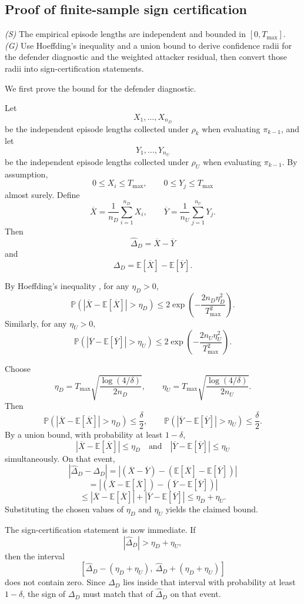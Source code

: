 \documentclass[11pt]{article}
\newcommand{\E}{\mathbb{E}}
\newcommand{\Prob}{\mathbb{P}}
\begin{document}
\subsection{Proof of finite-sample sign certification}

\noindent\textit{(S)} The empirical episode lengths are independent and bounded in $[0,T_{\max}]$. \textit{(G)} Use Hoeffding's inequality and a union bound to derive confidence radii for the defender diagnostic and the weighted attacker residual, then convert those radii into sign-certification statements.

We first prove the bound for the defender diagnostic.

Let
\[
X_1,\dots,X_{n_D}
\]
be the independent episode lengths collected under $\rho_k$ when evaluating $\pi_{k-1}$, and let
\[
Y_1,\dots,Y_{n_U}
\]
be the independent episode lengths collected under $\rho_U$ when evaluating $\pi_{k-1}$. By assumption,
\[
0 \le X_i \le T_{\max}, \qquad 0 \le Y_j \le T_{\max}
\]
almost surely. Define
\[
\overline{X}=\frac{1}{n_D}\sum_{i=1}^{n_D}X_i, \qquad \overline{Y}=\frac{1}{n_U}\sum_{j=1}^{n_U}Y_j.
\]
Then
\[
\widehat{\Delta}_D=\overline{X}-\overline{Y}
\]
and
\[
\Delta_D=\E[\overline{X}]-\E[\overline{Y}].
\]

By Hoeffding's inequality \citep{Hoeffding1963}, for any $\eta_D>0$,
\[
\Prob\left(|\overline{X}-\E[\overline{X}]|>\eta_D\right)
\le
2\exp\left(-\frac{2n_D\eta_D^2}{T_{\max}^2}\right).
\]
Similarly, for any $\eta_U>0$,
\[
\Prob\left(|\overline{Y}-\E[\overline{Y}]|>\eta_U\right)
\le
2\exp\left(-\frac{2n_U\eta_U^2}{T_{\max}^2}\right).
\]

Choose
\[
\eta_D=T_{\max}\sqrt{\frac{\log(4/\delta)}{2n_D}},
\qquad
\eta_U=T_{\max}\sqrt{\frac{\log(4/\delta)}{2n_U}}.
\]
Then
\[
\Prob\left(|\overline{X}-\E[\overline{X}]|>\eta_D\right)\le \frac{\delta}{2},
\qquad
\Prob\left(|\overline{Y}-\E[\overline{Y}]|>\eta_U\right)\le \frac{\delta}{2}.
\]
By a union bound, with probability at least $1-\delta$,
\[
|\overline{X}-\E[\overline{X}]|\le \eta_D
\quad\text{and}\quad
|\overline{Y}-\E[\overline{Y}]|\le \eta_U
\]
simultaneously. On that event,
\[
|\widehat{\Delta}_D-\Delta_D|
=
|(\overline{X}-\overline{Y})-(\E[\overline{X}]-\E[\overline{Y}])|
\]
\[
=
|(\overline{X}-\E[\overline{X}])-(\overline{Y}-\E[\overline{Y}])|
\]
\[
\le
|\overline{X}-\E[\overline{X}]| + |\overline{Y}-\E[\overline{Y}]|
\le
\eta_D+\eta_U.
\]
Substituting the chosen values of $\eta_D$ and $\eta_U$ yields the claimed bound.

The sign-certification statement is now immediate. If
\[
|\widehat{\Delta}_D|>\eta_D+\eta_U,
\]
then the interval
\[
[\widehat{\Delta}_D-(\eta_D+\eta_U),\ \widehat{\Delta}_D+(\eta_D+\eta_U)]
\]
does not contain zero. Since $\Delta_D$ lies inside that interval with probability at least $1-\delta$, the sign of $\Delta_D$ must match that of $\widehat{\Delta}_D$ on that event.
\end{document}
